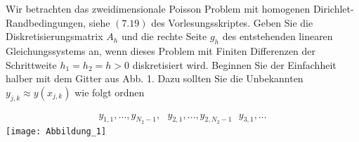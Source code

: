 \begin{exercise}
  Wir betrachten das zweidimensionale Poisson Problem mit homogenen
  Dirichlet-Randbedingungen, siehe $(7.19)$ des Vorlesungsskriptes. Geben Sie
  die Diskretisierungsmatrix $A_h$ und die rechte Seite $g_h$ des entstehenden
  linearen Gleichungssystems an, wenn dieses Problem mit Finiten Differenzen der
  Schrittweite $h_1 = h_2 = h > 0$ diskretisiert wird. Beginnen Sie der Einfachheit
  halber mit dem Gitter aus Abb. 1. Dazu sollten Sie die Unbekannten
  $y_{j,k} \approx y(x_{j,k})$ wie folgt ordnen

  \begin{align}\label{sec}
    y_{1,1}, \dots , y_{N_2 -1}, \text{ }
    y_{2,1}, \dots , y_{2,N_2 -1} \text{ }
    y_{3,1}, \dots
  \end{align}
  \texttt{[image: Abbildung\_1]}
  \end{exercise}


